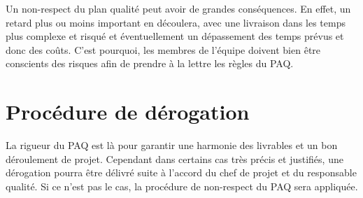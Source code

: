 Un non-respect du plan qualité peut avoir de grandes conséquences. En effet, un retard plus ou moins important en découlera, avec une livraison dans les temps plus complexe et risqué et éventuellement un dépassement des temps prévus et donc des coûts. C’est pourquoi, les membres de l’équipe doivent bien être conscients des risques afin de prendre à la lettre les règles du PAQ.
    
\section{Procédure de dérogation}

La rigueur du PAQ est là pour garantir une harmonie des livrables et un bon déroulement de projet. Cependant dans certains cas très précis et justifiés, une dérogation pourra être délivré suite à l’accord du chef de projet et du responsable qualité. Si ce n’est pas le cas, la procédure de non-respect du PAQ sera appliquée.
